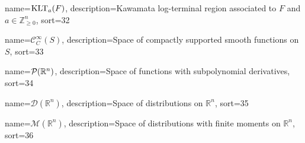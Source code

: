 {
  name={\ensuremath{\KLT_a(F)}},
  description={Kawamata log-terminal region associated to $F$ and $a\in \mathbb{Z}_{\geq 0}^n$},
  sort=32
}

{
  name={\ensuremath{\mathcal{C}_C^\infty(S)}},
  description={Space of compactly supported smooth functions on $S$},
  sort=33
}


{
  name={\ensuremath{\mathcal{P}(\R^n)}},
  description={Space of functions with subpolynomial derivatives},
  sort=34
}


{
  name={\ensuremath{\mathcal{D}(\mathbb{R}^n)}},
  description={Space of distributions on $\mathbb{R}^n$},
  sort=35
}


{
  name={\ensuremath{\mathcal{M}(\mathbb{R}^n)}},
  description={Space of distributions with finite moments on $\mathbb{R}^n$},
  sort=36
}


